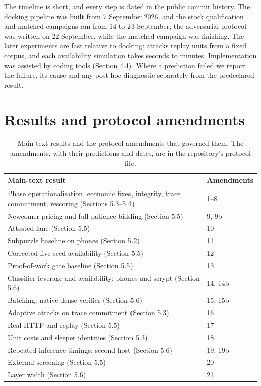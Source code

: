 \documentclass[11pt]{article}
\newcommand{\botrule}{\bottomrule}
\begin{document}
The timeline is short, and every step is dated in the public commit history. The docking pipeline was built from 7 September 2026, and the stock qualification and matched campaigns ran from 14 to 23 September; the adversarial protocol was written on 22 September, while the matched campaign was finishing. The later experiments are fast relative to docking: attacks replay units from a fixed corpus, and each availability simulation takes seconds to minutes. Implementation was assisted by coding tools (Section 4.4). Where a prediction failed we report the failure, its cause and any post-hoc diagnostic separately from the predeclared result.

\section{Results and protocol amendments}

\begin{table}[htbp]
\caption{Main-text results and the protocol amendments that governed them. The amendments, with their predictions and dates, are in the repository's protocol file.}
\centering
\small
\begin{tabularx}{\textwidth}{XX}
\toprule
Main-text result & Amendments \\
\midrule
Phase operationalisation, economic fixes, integrity, trace commitment, rescoring (Sections 5.3--5.4) & 1--8 \\
Newcomer pricing and full-patience bidding (Section 5.5) & 9, 9b \\
Attested lane (Section 5.5) & 10 \\
Subpuzzle baseline on phones (Section 5.2) & 11 \\
Corrected five-seed availability (Section 5.5) & 12 \\
Proof-of-work gate baseline (Section 5.5) & 13 \\
Classifier leverage and availability; phones and scrypt (Section 5.6) & 14, 14b \\
Batching; native dense verifier (Section 5.6) & 15, 15b \\
Adaptive attacks on trace commitment (Section 5.3) & 16 \\
Real HTTP and replay (Section 5.5) & 17 \\
Unit costs and sleeper identities (Section 5.3) & 18 \\
Repeated inference timings; second host (Section 5.6) & 19, 19b \\
External screening (Section 5.5) & 20 \\
Layer width (Section 5.6) & 21 \\
\botrule
\end{tabularx}
\end{table}



\end{document}
